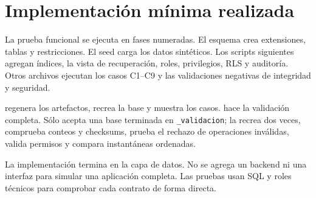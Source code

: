 \section{Implementación mínima realizada}

La prueba funcional se ejecuta en fases numeradas. El esquema crea extensiones,
tablas y restricciones. El seed carga los datos sintéticos. Los scripts
siguientes agregan índices, la vista de recuperación, roles, privilegios, RLS y
auditoría. Otros archivos ejecutan los casos C1--C9 y las validaciones negativas
de integridad y seguridad.

 regenera los artefactos, recrea la base y muestra
los casos.  hace la validación completa. Sólo
acepta una base terminada en \texttt{\_validacion}; la recrea dos veces,
comprueba conteos y checksums, prueba el rechazo de operaciones inválidas,
valida permisos y compara instantáneas ordenadas.

La implementación termina en la capa de datos. No se agrega un backend ni una
interfaz para simular una aplicación completa. Las pruebas usan SQL y roles
técnicos para comprobar cada contrato de forma directa.
